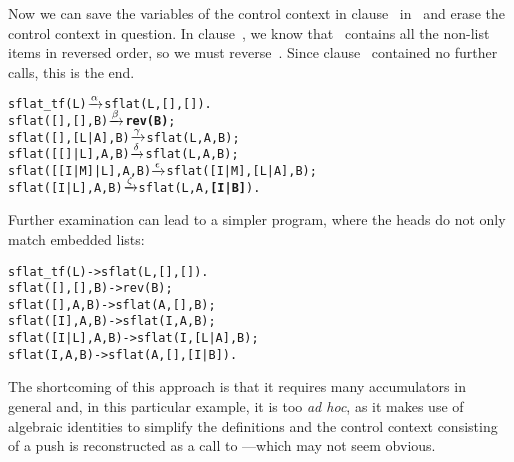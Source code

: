 Now we can save the variables of the control context in
clause~\clause{\zeta} in~ and erase the control context in
question. In clause~\clause{\beta}, we know that ~contains
all the non\hyp{}list items in reversed order, so we must
reverse~. Since clause~\clause{\beta} contained no further
calls, this is the end.
\begin{alltt}
sflat_tf(L)              \(\smashedrightarrow{\alpha}\) sflat(L,[],[]).
sflat(       [],   [],B) \(\smashedrightarrow{\beta}\) \textbf{rev(B)};
sflat(       [],[L|A],B) \(\smashedrightarrow{\gamma}\) sflat(L,A,B);
sflat(   [[]|L],    A,B) \(\smashedrightarrow{\delta}\) sflat(L,A,B);
sflat([[I|M]|L],    A,B) \(\smashedrightarrow{\epsilon}\) sflat([I|M],[L|A],B);
sflat(    [I|L],    A,B) \(\smashedrightarrow{\zeta}\) sflat(L,A,\textbf{[I|B]}).
\end{alltt}
Further examination can lead to a simpler program, where the heads do
not only match embedded lists:
\begin{alltt}
sflat_tf(L)       -> sflat(L,[],[]).
sflat(   [],[],B) -> rev(B);
sflat(   [], A,B) -> sflat(A,   [],    B);
sflat(  [I], A,B) -> sflat(I,    A,    B);\hfill% \emph{Optimisation}
sflat([I|L], A,B) -> sflat(I,[L|A],    B);
sflat(    I, A,B) -> sflat(A,   [],[I|B]).
\end{alltt}
The shortcoming of this approach is that it requires many accumulators
in general and, in this particular example, it is too \emph{ad hoc},
as it makes use of algebraic identities to simplify the definitions
and the control context consisting of a push is reconstructed as a
call to ---which may not seem obvious.

